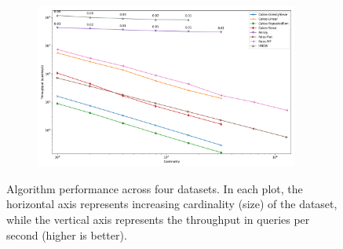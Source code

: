 \begin{figure}
\begin{subfigure}[b]{0.4\textwidth}
\label{fig:results:sift-scaling}
\end{subfigure}%
\begin{subfigure}[b]{0.4\textwidth}
\includegraphics[width=0.95\textwidth]{plots/random-1000000-128-knn-10.png}\\
\label{fig:results:random-scaling}
\end{subfigure}%

\caption{Algorithm performance across four datasets. In each plot, the horizontal axis represents increasing cardinality (size) of the dataset, while the vertical axis represents the throughput in queries per second (higher is better).}
\end{figure}

% 




